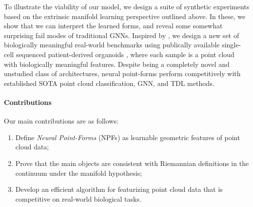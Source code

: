 \documentclass{article}
\newcommand{\kelly}[1]{}
\let\todo\undefined
\let\todo\undefined
\newcommand{\todo}[1][]{}
\theoremstyle{remark}
\theoremstyle{plain}
\begin{document}
To illustrate the viability of our model, we design a suite of synthetic experiments based on the extrinsic manifold learning perspective outlined above. In these, we show that we can interpret the learned forms, and reveal some somewhat surprising fail modes of traditional GNNs. Inspired by \cite{viswanath2025hiponet}, we design a new set of biologically meaningful real-world benchmarks using publically available single-cell sequenced patient-derived organoids \cite{RamosZapatero2023}, where each sample is a point cloud with biologically meaningful features. Despite being a completely novel and unstudied class of architectures, neural point-forms perform competitively with established SOTA point cloud classification, GNN, and TDL methods. 

\paragraph{Contributions} Our main contributions are as follows:
\begin{enumerate}
    \item Define \textit{Neural Point-Forms} (NPFs) as learnable geometric features of point cloud data; 
    \item Prove that the main objects are consistent with Riemannian definitions in the continuum under the manifold hypothesis;
    \item Develop an efficient algorithm for featurizing point cloud data that is competitive on real-world biological tasks.
\end{enumerate}

\end{document}
